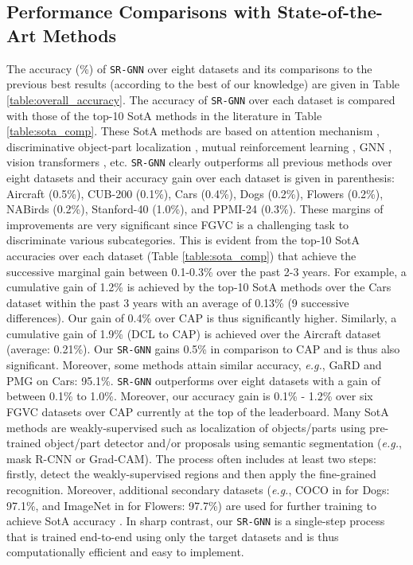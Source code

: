 \documentclass[journal]{IEEEtran}
\begin{document}
\vspace{ -0.3 cm}
\subsection{Performance Comparisons with State-of-the-Art Methods} 
The accuracy (\%) of \texttt{SR-GNN} over eight datasets and its comparisons to the previous best results (according to the best of our knowledge) are given in Table \ref{table:overall_accuracy}. 
The accuracy of \texttt{SR-GNN} over each dataset is compared with those of the top-10 SotA methods in the literature in Table \ref{table:sota_comp}. These SotA methods are based on attention mechanism \cite{behera2021context, behera2020regional, chang2020devil, zhang2019learning, lopez2020pay, ding2019selective, liu2019bidirectional}, discriminative object-part localization \cite {ge2019weakly, wang2019weakly, chen2019destruction}, 
mutual reinforcement learning \cite{liu2019bidirectional}, GNN \cite{wang2020graph, wang2020category, zhao2021graph}, vision transformers \cite{dosovitskiy2020image, liu2021swin, he2021transfg, miao2021complemental}, etc.  \texttt{SR-GNN} clearly outperforms all previous methods over eight datasets and their accuracy gain over each dataset is given in parenthesis: Aircraft (0.5\%), CUB-200 (0.1\%), Cars (0.4\%), Dogs (0.2\%), Flowers (0.2\%), NABirds (0.2\%), Stanford-40 (1.0\%), and PPMI-24 (0.3\%). These margins of improvements are very significant since FGVC is a challenging task to discriminate various subcategories. This is evident from the top-10 SotA accuracies over each dataset (Table \ref{table:sota_comp}) that achieve the successive marginal gain between 0.1-0.3\% over the past 2-3 years. For example, a cumulative gain of 1.2\% is achieved by the top-10 SotA methods over the Cars dataset within the past 3 years with an average of 0.13\% (9 successive differences). Our gain of 0.4\% over CAP is thus significantly higher. Similarly, a cumulative gain of 1.9\% (DCL to CAP) is achieved over the Aircraft dataset (average: 0.21\%). Our \texttt{SR-GNN} gains 0.5\% in comparison to CAP and is thus also significant. Moreover, some methods attain similar accuracy, \textit{e.g.}, GaRD \cite{zhao2021graph} and PMG \cite {chang2021your} on Cars: 95.1\%. \texttt{SR-GNN} outperforms over eight datasets with a gain of between 0.1\% to 1.0\%.  Moreover, our accuracy gain is 0.1\% - 1.2\% over six FGVC datasets over CAP currently at the top of the leaderboard. 
Many SotA methods are weakly-supervised such as localization of objects/parts using pre-trained object/part detector and/or proposals using semantic segmentation (\textit{e.g.}, mask R-CNN 
or Grad-CAM). The process often includes at least two steps: firstly, detect the weakly-supervised regions and then apply the fine-grained recognition. Moreover, additional secondary datasets (\textit{e.g.}, COCO in \cite{ge2019weakly} for Dogs: 97.1\%, and ImageNet in \cite{chang2020devil} for Flowers: 97.7\%) are used for further training to achieve SotA accuracy \cite{ge2019weakly}. In sharp contrast, our \texttt{SR-GNN} is a single-step process that is trained end-to-end using only the target datasets and is thus computationally efficient and easy to implement.  
\end{document}
